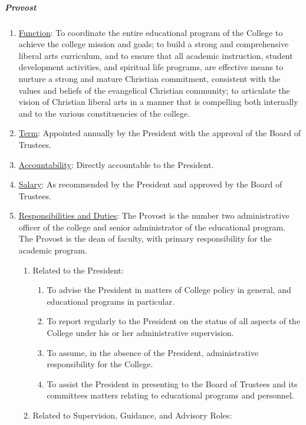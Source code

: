 \documentclass[letterpaper, 11pt]{article}
\begin{document}
				\subparagraph{Provost}
					\begin{enumerate}
						\item{\underline{Function}:  To coordinate the entire educational program of the College to achieve the college mission and goals; to build a strong and comprehensive liberal arts curriculum, and to ensure that all academic instruction, student development activities, and spiritual life programs, are effective means to nurture a strong and mature Christian commitment, consistent with the values and beliefs of the evangelical Christian community; to articulate the vision of Christian liberal arts in a manner that is compelling both internally and to the various constituencies of the college.}

						\item{\underline{Term}:  Appointed annually by the President with the approval of the Board of Trustees.}
						\item{\underline{Accountability}:  Directly accountable to the President.}
						\item{\underline{Salary}:  As recommended by the President and approved by the Board of Trustees.}
						\item{\underline{Responsibilities and Duties}:  The Provost is the number two administrative officer of the college and senior administrator of the educational program.  The Provost is the dean of faculty, with primary responsibility for the academic program.
							\begin{enumerate}
								\item{Related to the President:
									\begin{enumerate}
										\item{To advise the President in matters of College policy in general, and educational programs in particular.}
										\item{To report regularly to the President on the status of all aspects of the College under his or her administrative supervision.}
										\item{To assume, in the absence of the President, administrative responsibility for the College.}
										\item{To assist the President in presenting to the Board of Trustees and its committees matters relating to educational programs and personnel.}
									\end{enumerate}
								}
								\item{Related to Supervision, Guidance, and Advisory Roles:
									\begin{enumerate}

\end{enumerate}}
\end{enumerate}}
\end{enumerate}
\end{document}
